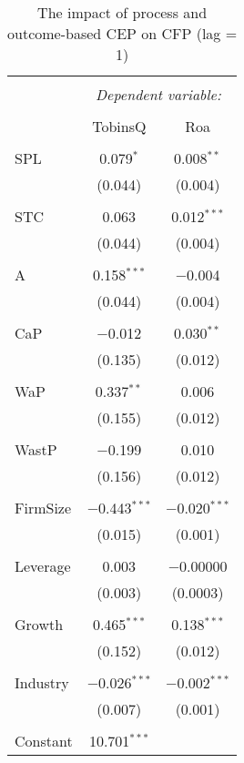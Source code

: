 \documentclass[]{article}
\begin{document}
\begin{table}[!] \centering 
  \caption{The impact of process and outcome-based CEP on CFP (lag = 1)} 
  \label{Lag1} 
\begin{tabular}{@{\extracolsep{5pt}}lcc} 
\\[-1.8ex]\hline 
\hline \\[-1.8ex] 
 & \multicolumn{2}{c}{\textit{Dependent variable:}} \\ 
\cline{2-3} 
\\[-1.8ex] & TobinsQ & Roa \\ 
\hline \\[-1.8ex] 
 SPL & 0.079$^{*}$ & 0.008$^{**}$ \\ 
  & (0.044) & (0.004) \\ 
  & & \\ 
 STC & 0.063 & 0.012$^{***}$ \\ 
  & (0.044) & (0.004) \\ 
  & & \\ 
 A & 0.158$^{***}$ & $-$0.004 \\ 
  & (0.044) & (0.004) \\ 
  & & \\ 
 CaP & $-$0.012 & 0.030$^{**}$ \\ 
  & (0.135) & (0.012) \\ 
  & & \\ 
 WaP & 0.337$^{**}$ & 0.006 \\ 
  & (0.155) & (0.012) \\ 
  & & \\ 
 WastP & $-$0.199 & 0.010 \\ 
  & (0.156) & (0.012) \\ 
  & & \\ 
 FirmSize & $-$0.443$^{***}$ & $-$0.020$^{***}$ \\ 
  & (0.015) & (0.001) \\ 
  & & \\ 
 Leverage & 0.003 & $-$0.00000 \\ 
  & (0.003) & (0.0003) \\ 
  & & \\ 
 Growth & 0.465$^{***}$ & 0.138$^{***}$ \\ 
  & (0.152) & (0.012) \\ 
  & & \\ 
 Industry & $-$0.026$^{***}$ & $-$0.002$^{***}$ \\ 
  & (0.007) & (0.001) \\ 
  & & \\ 
 Constant & 10.701$^{***}$ &  \\ 

\end{tabular}
\end{table}
\end{document}
